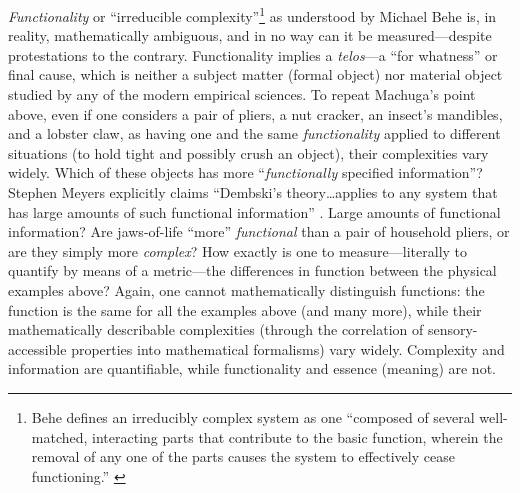 \textit{Functionality} or ``irreducible complexity''\footnote{Behe defines an irreducibly complex system as one “composed of several well-matched, interacting parts that contribute to the basic function, wherein the removal of any one of the parts causes the system to effectively cease functioning.” \citep[][p.~39]{behe2006}} as understood by Michael Behe is, in reality, mathematically ambiguous, and in no way can it be measured---despite protestations to the contrary. Functionality implies a \textit{telos}---a “for whatness” or final cause, which is neither a subject matter (formal object) nor material object studied by any of the modern empirical sciences.  To repeat Machuga's point above, even if one considers a pair of pliers, a nut cracker, an insect's mandibles, and a lobster claw, as having one and the same \textit{functionality} applied to different situations (to hold tight and possibly crush an object), their complexities vary widely. Which of these objects has more ``\textit{functionally} specified information''? Stephen Meyers explicitly claims ``Dembski's theory\ldots applies to any system that has large amounts of such functional information'' \cite[p.~372]{sigcell}. Large amounts of functional information? Are jaws-of-life ``more'' \textit{functional} than a pair of household pliers, or are they simply more \textit{complex}?  How exactly is one to measure---literally to quantify by means of a metric---the differences in function between the physical examples above? Again, one cannot mathematically distinguish functions: the function is the same for all the examples above (and many more), while their mathematically describable complexities (through the correlation of sensory-accessible properties into mathematical formalisms) vary widely.  Complexity and information are quantifiable, while functionality and essence (meaning) are not.

